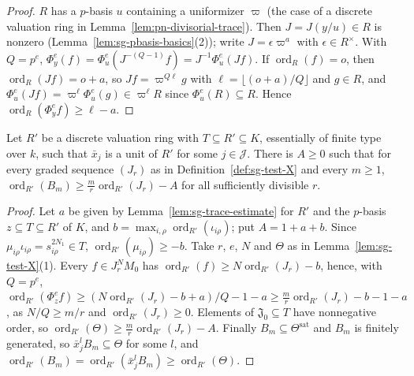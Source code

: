 \begin{proof}
$R$ has a $p$-basis $u$ containing a uniformizer $\varpi$ (the case of a discrete valuation ring in Lemma~\ref{lem:pn-divisorial-trace}). Then $J=J(y/u)\in R$
is nonzero (Lemma~\ref{lem:sg-pbasis-basics}(2)); write $J=\epsilon\varpi^a$ with $\epsilon\in R^\times$. With $Q=p^e$, $\Phi^e_y(f)=\Phi^e_u(J^{-(Q-1)}f)=J^{-1}\Phi^e_u(Jf)$.
If $\operatorname{ord}_R(f)=o$, then $\operatorname{ord}_R(Jf)=o+a$, so $Jf=\varpi^{Q\ell}g$ with $\ell=\lfloor(o+a)/Q\rfloor$ and $g\in R$, and
$\Phi^e_u(Jf)=\varpi^\ell\Phi^e_u(g)\in\varpi^\ell R$ since $\Phi^e_u(R)\subseteq R$. Hence $\operatorname{ord}_R(\Phi^e_yf)\ge\ell-a$.
\end{proof}

\begin{proposition}\label{prop:sg-valuative-bound}
\leanok
{}
Let $R'$ be a discrete valuation ring with $T\subseteq R'\subseteq K$, essentially of finite type over $k$, such that $\bar x_j$ is a unit of $R'$ for
some $j\in\mathcal J$. There is $A\ge0$ such that for every graded sequence $(J_r)$ as in Definition~\ref{def:sg-test-X} and every $m\ge1$,
$\operatorname{ord}_{R'}(B_m)\ge\frac mr\operatorname{ord}_{R'}(J_r)-A$ for all sufficiently divisible $r$.
\end{proposition}

\begin{proof}
Let $a$ be given by Lemma~\ref{lem:sg-trace-estimate} for $R'$ and the $p$-basis $z\subseteq T\subseteq R'$ of $K$, and $b=\max_{i,\rho}\operatorname{ord}_{R'}(\iota_{i\rho})$; put
$A=1+a+b$. Since $\mu_{i\rho}\iota_{i\rho}=s_{i\rho}^{2N_1}\in T$, $\operatorname{ord}_{R'}(\mu_{i\rho})\ge-b$. Take $r$, $e$, $N$ and $\Theta$ as in
Lemma~\ref{lem:sg-test-X}(1). Every $f\in J_r^NM_0$ has $\operatorname{ord}_{R'}(f)\ge N\operatorname{ord}_{R'}(J_r)-b$, hence, with $Q=p^e$,
$\operatorname{ord}_{R'}(\Phi^e_zf)\ge(N\operatorname{ord}_{R'}(J_r)-b+a)/Q-1-a\ge\frac mr\operatorname{ord}_{R'}(J_r)-b-1-a$, as $N/Q\ge m/r$ and $\operatorname{ord}_{R'}(J_r)\ge0$. Elements of
$\mathfrak J_0\subseteq T$ have nonnegative order, so $\operatorname{ord}_{R'}(\Theta)\ge\frac mr\operatorname{ord}_{R'}(J_r)-A$. Finally $B_m\subseteq\Theta^{\mathrm{sat}}$ and
$B_m$ is finitely generated, so $\bar x_j^{l}B_m\subseteq\Theta$ for some $l$, and $\operatorname{ord}_{R'}(B_m)=\operatorname{ord}_{R'}(\bar x_j^lB_m)\ge\operatorname{ord}_{R'}(\Theta)$.
\end{proof}

